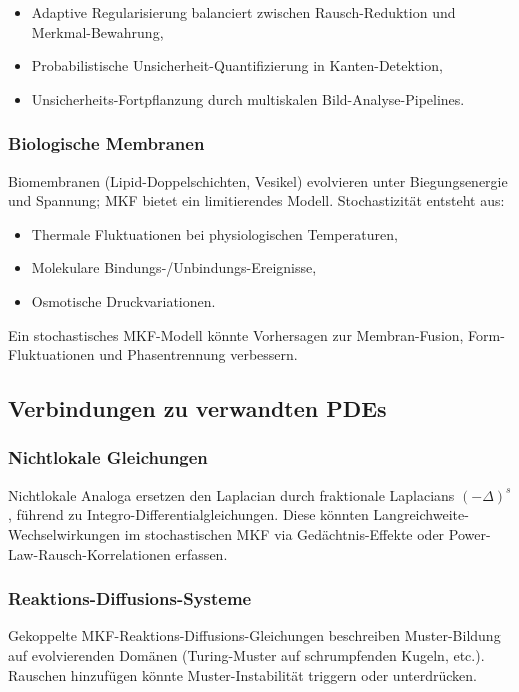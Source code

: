 \documentclass[a4paper,12pt]{article}
\theoremstyle{definition}
\begin{document}
\begin{itemize}
	\item Adaptive Regularisierung balanciert zwischen Rausch-Reduktion und Merkmal-Bewahrung,
	\item Probabilistische Unsicherheit-Quantifizierung in Kanten-Detektion,
	\item Unsicherheits-Fortpflanzung durch multiskalen Bild-Analyse-Pipelines.
\end{itemize}

\subsubsection{Biologische Membranen}

Biomembranen (Lipid-Doppelschichten, Vesikel) evolvieren unter Biegungsenergie und Spannung; MKF bietet ein limitierendes Modell. Stochastizität entsteht aus:

\begin{itemize}
	\item Thermale Fluktuationen bei physiologischen Temperaturen,
	\item Molekulare Bindungs-/Unbindungs-Ereignisse,
	\item Osmotische Druckvariationen.
\end{itemize}

Ein stochastisches MKF-Modell könnte Vorhersagen zur Membran-Fusion, Form-Fluktuationen und Phasentrennung verbessern.

\subsection{Verbindungen zu verwandten PDEs}

\subsubsection{Nichtlokale Gleichungen}

Nichtlokale Analoga ersetzen den Laplacian durch fraktionale Laplacians $(-\Delta)^{s}$, führend zu Integro-Differentialgleichungen. Diese könnten Langreichweite-Wechselwirkungen im stochastischen MKF via Gedächtnis-Effekte oder Power-Law-Rausch-Korrelationen erfassen.

\subsubsection{Reaktions-Diffusions-Systeme}

Gekoppelte MKF-Reaktions-Diffusions-Gleichungen beschreiben Muster-Bildung auf evolvierenden Domänen (Turing-Muster auf schrumpfenden Kugeln, etc.). Rauschen hinzufügen könnte Muster-Instabilität triggern oder unterdrücken.
\end{document}

